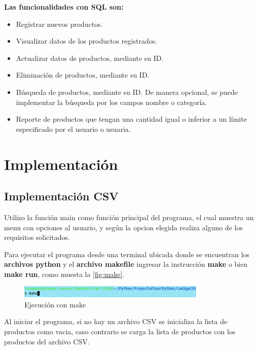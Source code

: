 \documentclass[12pt]{article}
\begin{document}
\textbf{Las funcionalidades con SQL son:}\\
\begin{itemize}
	\item Registrar nuevos productos.
	\item Visualizar datos de los productos registrados.
	\item Actualizar datos de productos, mediante su ID.
	\item Eliminación de productos, mediante su ID.
	\item Búsqueda de productos, mediante su ID. De manera opcional, se puede implementar la búsqueda por los campos nombre o categoría.
	\item Reporte de productos que tengan una cantidad igual o inferior a un límite especificado por el usuario o usuaria.
\end{itemize}
\section{Implementación}

\subsection{Implementación CSV}

Utilizo la función main como función principal del programa, el cual muestra un menu con opciones al usuario, y según la opcion elegida realiza alguno de los requisitos solicitados.

Para ejecutar el programa desde una terminal ubicada donde se encuentran los \textbf{archivos python} y el \textbf{archivo makefile} ingresar la instrucción \textbf{make} o bien \textbf{make run}, como muesta la \autoref{fig:make}.

\begin{figure}[H]
	\centering
	\setlength{\fboxrule}{0pt}
	\includegraphics[width=0.8\textwidth]{Imagenes/make.png}
	\caption{Ejecución con make}
	\label{fig:make}
\end{figure}  

Al iniciar el programa, si no hay un archivo CSV se inicializa la lista de productos como vacia, caso contrario se carga la lista de productos con los productos del archivo CSV.\\
\end{document}
